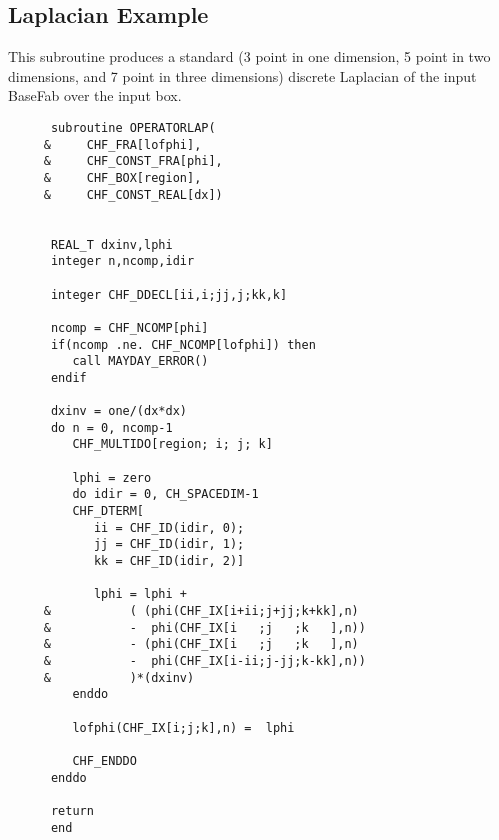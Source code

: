 \subsection{Laplacian Example}
\label{subsec:LaplacianExample}
This subroutine produces a standard (3 point in one dimension,
5 point in two dimensions, and 7 point in three dimensions) discrete
Laplacian of the input BaseFab over the input box.
\begin{small}
\begin{verbatim}
      subroutine OPERATORLAP(
     &     CHF_FRA[lofphi],
     &     CHF_CONST_FRA[phi],
     &     CHF_BOX[region],
     &     CHF_CONST_REAL[dx])


      REAL_T dxinv,lphi
      integer n,ncomp,idir
      
      integer CHF_DDECL[ii,i;jj,j;kk,k]

      ncomp = CHF_NCOMP[phi]
      if(ncomp .ne. CHF_NCOMP[lofphi]) then
         call MAYDAY_ERROR()
      endif

      dxinv = one/(dx*dx)
      do n = 0, ncomp-1
         CHF_MULTIDO[region; i; j; k]

         lphi = zero
         do idir = 0, CH_SPACEDIM-1
         CHF_DTERM[
            ii = CHF_ID(idir, 0);
            jj = CHF_ID(idir, 1);
            kk = CHF_ID(idir, 2)]

            lphi = lphi +
     &           ( (phi(CHF_IX[i+ii;j+jj;k+kk],n)
     &           -  phi(CHF_IX[i   ;j   ;k   ],n))
     &           - (phi(CHF_IX[i   ;j   ;k   ],n)
     &           -  phi(CHF_IX[i-ii;j-jj;k-kk],n))
     &           )*(dxinv)
         enddo

         lofphi(CHF_IX[i;j;k],n) =  lphi

         CHF_ENDDO
      enddo

      return
      end
\end{verbatim}
\end{small}

